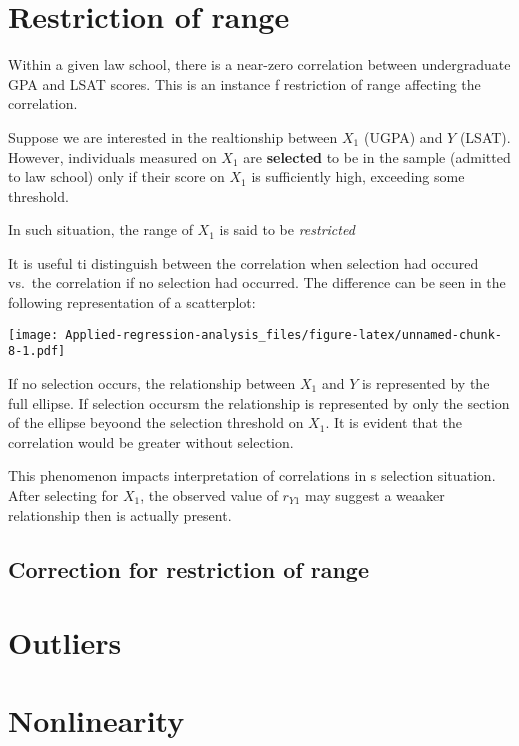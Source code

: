\documentclass[
]{book}
\begin{document}
\hypertarget{restriction-of-range}{%
\section{Restriction of range}\label{restriction-of-range}}

Within a given law school, there is a near-zero correlation between undergraduate GPA and LSAT scores. This is an instance f restriction of range affecting the correlation.

Suppose we are interested in the realtionship between \(X_1\) (UGPA) and \(Y\) (LSAT). However, individuals measured on \(X_1\) are \textbf{selected} to be in the sample (admitted to law school) only if their score on \(X_1\) is sufficiently high, exceeding some threshold.

In such situation, the range of \(X_1\) is said to be \emph{restricted}

It is useful ti distinguish between the correlation when selection had occured vs.~the correlation if no selection had occurred. The difference can be seen in the following representation of a scatterplot:

\texttt{[image: Applied-regression-analysis\_files/figure-latex/unnamed-chunk-8-1.pdf]}

If no selection occurs, the relationship between \(X_1\) and \(Y\) is represented by the full ellipse. If selection occursm the relationship is represented by only the section of the ellipse beyoond the selection threshold on \(X_1\). It is evident that the correlation would be greater without selection.

This phenomenon impacts interpretation of correlations in s selection situation. After selecting for \(X_1\), the observed value of \(r_{Y1}\) may suggest a weaaker relationship then is actually present.

\hypertarget{correction-for-restriction-of-range}{%
\subsection{Correction for restriction of range}\label{correction-for-restriction-of-range}}

\hypertarget{outliers}{%
\section{Outliers}\label{outliers}}

\hypertarget{nonlinearity}{%
\section{Nonlinearity}\label{nonlinearity}}
\end{document}
